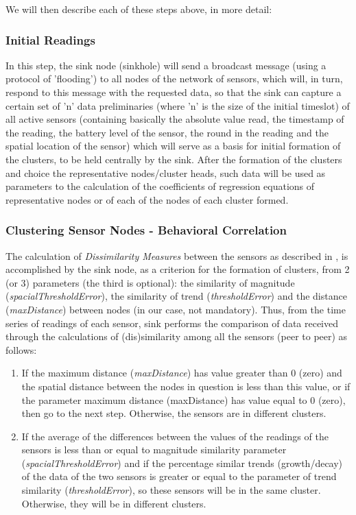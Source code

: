 \documentclass[conference]{IEEEtran}
\begin{document}
We will then describe each of these steps above, in more detail:  
  
\subsubsection{Initial Readings}

In this step, the sink node (sinkhole) will send a broadcast message (using a
protocol of 'flooding') to all nodes of the network of sensors, which will, in
turn, respond to this message with the requested data, so that the sink can
capture a certain set of 'n' data preliminaries (where 'n' is the size of the
initial timeslot) of all active sensors (containing basically the absolute value
read, the timestamp of the reading, the battery level of the sensor, the round
in the reading and the spatial location of the sensor) which will serve as a
basis for initial formation of the clusters, to be held centrally by the sink.
After the formation of the clusters and choice the representative nodes/cluster
heads, such data will be used as parameters to the calculation of the
coefficients of regression equations of representative nodes or of each of the
nodes of each cluster formed.

\subsubsection{Clustering Sensor Nodes - Behavioral Correlation}

The calculation of \textit{Dissimilarity Measures} between the sensors as
described in \cite{Liu2007}, is accomplished by the sink node, as a criterion
for the formation of clusters, from 2 (or 3) parameters (the third is optional):
the similarity of magnitude (\textit{spacialThresholdError}), the similarity of
trend (\textit{thresholdError}) and the distance (\textit{maxDistance}) between
nodes (in our case, not mandatory). Thus, from the time series of readings of
each sensor, sink performs the comparison of data received through the
calculations of (dis)similarity among all the sensors (peer to peer) as follows:

\begin{enumerate}
    \item If the maximum distance (\textit{maxDistance}) has value greater than
0 (zero) and the spatial distance between the nodes in question is less than
this value, or if the parameter maximum distance (maxDistance) has value equal
to 0 (zero), then go to the next step. Otherwise, the sensors are in different
clusters.
    \item If the average of the differences between the values of the readings
of the sensors is less than or equal to magnitude similarity parameter
(\textit{spacialThresholdError}) and if the percentage similar trends
(growth/decay) of the data of the two sensors is greater or equal to the
parameter of trend similarity (\textit{thresholdError}), so these sensors
will be in the same cluster. Otherwise, they will be in different clusters.
 \end{enumerate}
\end{document}
